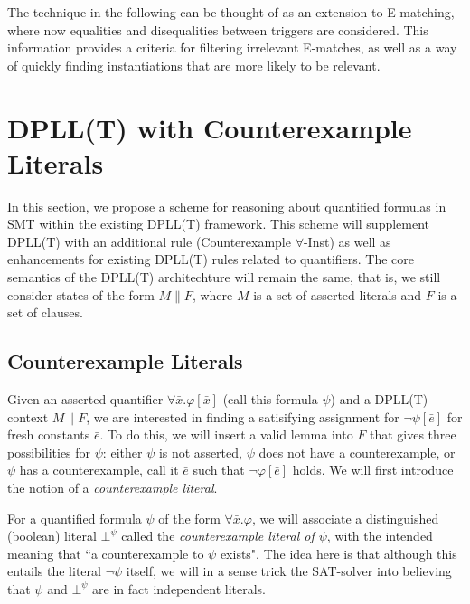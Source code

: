 \documentclass{llncs}
\begin{document}
The technique in the following can be thought of as an extension to E-matching, where now equalities and disequalities between triggers are considered.
This information provides a criteria for filtering irrelevant E-matches, as well as a way of quickly finding instantiations that are more likely to be relevant.

\section{DPLL(T) with Counterexample Literals}
\label{dpll-ce-lit}

In this section, we propose a scheme for reasoning about quantified formulas in SMT within the existing DPLL(T) framework.
This scheme will supplement DPLL(T) with an additional rule (Counterexample $\forall$-Inst) as well as enhancements for existing DPLL(T) rules related to quantifiers.
The core semantics of the DPLL(T) architechture will remain the same, that is, we still consider states of the form $M \parallel F$, where $M$ is a set of asserted literals and $F$ is a set of clauses.

\begin{comment}
Throughout the remainder of this document, we will assume that CNF-conversion has been applied to the body of all universally quantified formulas.
In other words, the only quantified formulas we consider are non-ground clauses of the form $\forall \bar{x}. ( l_1 \vee \ldots \vee l_n )[\bar{x}]$, where $l_1 \ldots l_n$ are theory literals.
\end{comment}

\subsection{Counterexample Literals}

Given an asserted quantifier $\forall \bar{x}. \varphi[\bar{x}]$ (call this formula $\psi$) and a DPLL(T) context $M \parallel F$, we are interested in finding a satisifying assignment for $ \neg \psi[\bar{e}]$ for fresh constants $\bar{e}$.
To do this, we will insert a valid lemma into $F$ that gives three possibilities for $\psi$: either $\psi$ is not asserted, $\psi$ does not have a counterexample, or $\psi$ has a counterexample, call it $\bar{e}$ such that $\neg \varphi[\bar{e}]$ holds.
We will first introduce the notion of a \emph{counterexample literal}.

For a quantified formula $\psi$ of the form $\forall \bar{ x }. \varphi$, we will associate a distinguished (boolean) literal $\bot^\psi$ called the \emph{counterexample literal of $\psi$}, with the intended meaning that ``a counterexample to $\psi$ exists".
The idea here is that although this entails the literal $\neg \psi$ itself, we will in a sense trick the SAT-solver into believing that $\psi$ and $\bot^\psi$ are in fact independent literals.
\end{document}

